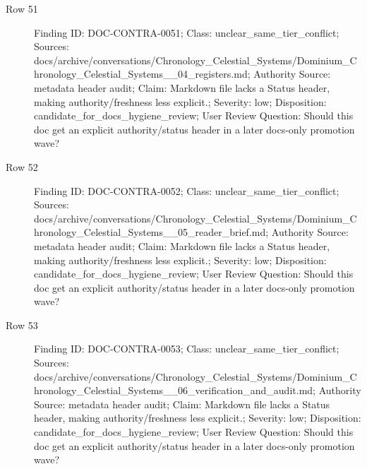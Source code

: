 \documentclass[10.5pt,a4paper,openany]{book}
\begin{document}
\begin{description}
\item[Row 51] Finding ID: DOC-\allowbreak{}CONTRA-\allowbreak{}0051; Class: unclear\_\allowbreak{}same\_\allowbreak{}tier\_\allowbreak{}conflict; Sources: docs/\allowbreak{}archive/\allowbreak{}conversations/\allowbreak{}Chronology\_\allowbreak{}Celestial\_\allowbreak{}Systems/\allowbreak{}Dominium\_\allowbreak{}Chronology\_\allowbreak{}Celestial\_\allowbreak{}Systems\_\allowbreak{}\_\allowbreak{}04\_\allowbreak{}registers.\allowbreak{}md; Authority Source: metadata header audit; Claim: Markdown file lacks a Status header, making authority/\allowbreak{}freshness less explicit.\allowbreak{}; Severity: low; Disposition: candidate\_\allowbreak{}for\_\allowbreak{}docs\_\allowbreak{}hygiene\_\allowbreak{}review; User Review Question: Should this doc get an explicit authority/\allowbreak{}status header in a later docs-\allowbreak{}only promotion wave?
\item[Row 52] Finding ID: DOC-\allowbreak{}CONTRA-\allowbreak{}0052; Class: unclear\_\allowbreak{}same\_\allowbreak{}tier\_\allowbreak{}conflict; Sources: docs/\allowbreak{}archive/\allowbreak{}conversations/\allowbreak{}Chronology\_\allowbreak{}Celestial\_\allowbreak{}Systems/\allowbreak{}Dominium\_\allowbreak{}Chronology\_\allowbreak{}Celestial\_\allowbreak{}Systems\_\allowbreak{}\_\allowbreak{}05\_\allowbreak{}reader\_\allowbreak{}brief.\allowbreak{}md; Authority Source: metadata header audit; Claim: Markdown file lacks a Status header, making authority/\allowbreak{}freshness less explicit.\allowbreak{}; Severity: low; Disposition: candidate\_\allowbreak{}for\_\allowbreak{}docs\_\allowbreak{}hygiene\_\allowbreak{}review; User Review Question: Should this doc get an explicit authority/\allowbreak{}status header in a later docs-\allowbreak{}only promotion wave?
\item[Row 53] Finding ID: DOC-\allowbreak{}CONTRA-\allowbreak{}0053; Class: unclear\_\allowbreak{}same\_\allowbreak{}tier\_\allowbreak{}conflict; Sources: docs/\allowbreak{}archive/\allowbreak{}conversations/\allowbreak{}Chronology\_\allowbreak{}Celestial\_\allowbreak{}Systems/\allowbreak{}Dominium\_\allowbreak{}Chronology\_\allowbreak{}Celestial\_\allowbreak{}Systems\_\allowbreak{}\_\allowbreak{}06\_\allowbreak{}verification\_\allowbreak{}and\_\allowbreak{}audit.\allowbreak{}md; Authority Source: metadata header audit; Claim: Markdown file lacks a Status header, making authority/\allowbreak{}freshness less explicit.\allowbreak{}; Severity: low; Disposition: candidate\_\allowbreak{}for\_\allowbreak{}docs\_\allowbreak{}hygiene\_\allowbreak{}review; User Review Question: Should this doc get an explicit authority/\allowbreak{}status header in a later docs-\allowbreak{}only promotion wave?

\end{description}
\end{document}
